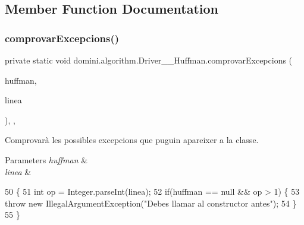 \subsection{Member Function Documentation}
\mbox{\label{classdomini_1_1algorithm_1_1Driver____Huffman_a5d56f18f1d8f96dfc735b9a127094319}} 
\subsubsection{\texorpdfstring{comprovar\+Excepcions()}{comprovarExcepcions()}}
{\footnotesize\ttfamily private static void domini.\+algorithm.\+Driver\+\_\+\+\_\+\+Huffman.\+comprovar\+Excepcions (\begin{DoxyParamCaption}\item[{\hyperlink{classHuffman}{Huffman}}]{huffman,  }\item[{String}]{linea }\end{DoxyParamCaption})\hspace{0.3cm}{\ttfamily [inline]}, {\ttfamily [static]}, {\ttfamily [private]}}



Comprovarà les possibles excepcions que puguin apareixer a la classe. 


\begin{DoxyParams}{Parameters}
{\em huffman} & \\
\hline
{\em linea} & \\
\hline
\end{DoxyParams}

\begin{DoxyCode}
50                                                                           \{
51         \textcolor{keywordtype}{int} op = Integer.parseInt(linea);
52         \textcolor{keywordflow}{if}(huffman == null && op > 1) \{
53             \textcolor{keywordflow}{throw} \textcolor{keyword}{new} IllegalArgumentException(\textcolor{stringliteral}{"Debes llamar al constructor antes"});
54         \}
55     \}
\end{DoxyCode}
\mbox{\label{classdomini_1_1algorithm_1_1Driver____Huffman_a2fe727dd4ebafefce42bdc94f5dd80fe}} 
